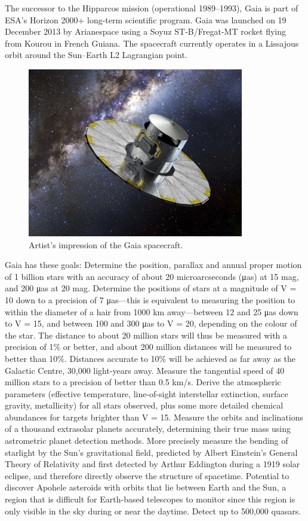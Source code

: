 \documentclass[12pt,a4paper]{article}
\begin{document}
	The successor to the Hipparcos mission (operational 1989–1993), Gaia is part of ESA's Horizon 2000+ long-term scientific program. Gaia was launched on 19 December 2013 by Arianespace using a Soyuz ST-B/Fregat-MT rocket flying from Kourou in French Guiana. The spacecraft currently operates in a Lissajous orbit around the Sun–Earth L2 Lagrangian point. 
	\begin{figure}[ht]
		\centering
		\caption{Artist's impression of the Gaia spacecraft.}
		\includegraphics[width=0.7\linewidth]{gaia.png}
	\end{figure}	
	Gaia has these goals: Determine the position, parallax and annual proper motion of 1 billion stars with an accuracy of about 20 microarcseconds (μas) at 15 mag, and 200 μas at 20 mag. Determine the positions of stars at a magnitude of V = 10 down to a precision of 7 μas—this is equivalent to measuring the position to within the diameter of a hair from 1000 km away—between 12 and 25 μas down to V = 15, and between 100 and 300 μas to V = 20, depending on the colour of the star. The distance to about 20 million stars will thus be measured with a precision of 1\% or better, and about 200 million distances will be measured to better than 10\%. Distances accurate to 10\% will be achieved as far away as the Galactic Centre, 30,000 light-years away. Measure the tangential speed of 40 million stars to a precision of better than 0.5 km/s. Derive the atmospheric parameters (effective temperature, line-of-sight interstellar extinction, surface gravity, metallicity) for all stars observed, plus some more detailed chemical abundances for targets brighter than V = 15. Measure the orbits and inclinations of a thousand extrasolar planets accurately, determining their true mass using astrometric planet detection methods. More precisely measure the bending of starlight by the Sun's gravitational field, predicted by Albert Einstein's General Theory of Relativity and first detected by Arthur Eddington during a 1919 solar eclipse, and therefore directly observe the structure of spacetime. Potential to discover Apohele asteroids with orbits that lie between Earth and the Sun, a region that is difficult for Earth-based telescopes to monitor since this region is only visible in the sky during or near the daytime. Detect up to 500,000 quasars.
	
\end{document}
